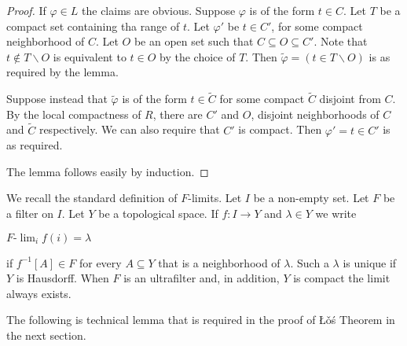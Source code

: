 \documentclass[11pt,oneside]{amsart}
\theoremstyle{plain}
\theoremstyle{remark}
\begin{document}
\begin{proof}
  If $\varphi\in L$ the claims are obvious.
  Suppose $\varphi$ is of the form $t\in C$.
  Let $T$ be a compact set containing tha range of $t$.
  Let $\varphi'$ be $t\in C'$, for some compact neighborhood of $C$.
  Let $O$ be an open set such that $C\subseteq O\subseteq C'$.
  Note that $t\notin  T\smallsetminus O$ is equivalent to $t\in O$ by the choice of $T$.
  Then $\tilde{\varphi}=(t\in T\smallsetminus O)$ is as required by the lemma.
  
  Suppose instead that $\tilde{\varphi}$ is of the form $t\in\tilde{C}$ for some compact $\tilde{C}$ disjoint from $C$.
  By the local compactness of $R$, there are $C'$ and $O$, disjoint neighborhoods of $C$ and $\tilde{C}$ respectively.
  We can also require that $C'$ is compact.
  Then  $\varphi'=t\in C'$ is as required.

  The lemma follows easily by induction.
\end{proof}

We recall the standard definition of $F$-limits.
Let $I$ be a non-empty set.
Let $F$ be a filter on $I$.
Let $Y$ be a topological space.
If $f:I\to Y$ and $\lambda\in Y$ we write

\hfil$\displaystyle F\mbox{-}\lim_{i}f(i)=\lambda$

if $f^{-1}[A]\in F$ for every $A\subseteq Y$ that is a neighborhood of $\lambda$.
Such a $\lambda$ is unique if $Y$ is Hausdorff.
When $F$ is an ultrafilter and, in addition, $Y$ is compact the limit always exists.

The following is technical lemma that is required in the proof of \L\v o\'s Theorem in the next section.
\end{document}
